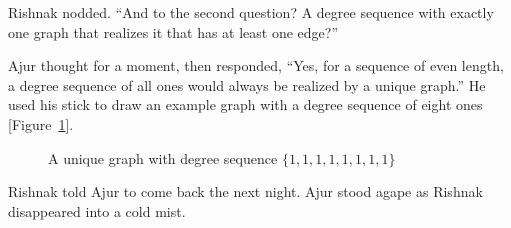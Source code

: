Rishnak nodded. ``And to the second question? A degree sequence with exactly one graph that realizes it that has at least one edge?''

Ajur thought for a moment, then responded, ``Yes, for a sequence of even length, a degree sequence of all ones would always be realized by a unique graph.''
He used his stick to draw an example graph with a degree sequence of eight ones [Figure~\ref{daya1}].

\begin{figure}
\begin{center}
\caption{A unique graph with degree sequence $\{1,1,1,1,1,1,1,1\}$}\label{daya1}
\end{center}
\end{figure}

Rishnak told Ajur to come back the next night. Ajur stood agape as Rishnak disappeared into a cold mist.